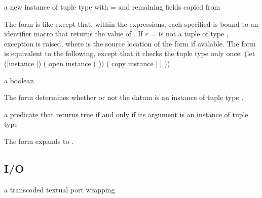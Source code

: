 \begin{syntax}
\end{syntax}
\returns{} a new instance of tuple type  with  =
 \etc{} and remaining fields copied from 

The  form is like  except that, within the  expressions,
each specified  is bound to an identifier macro that returns the value of .
If $r$ =  is not a tuple of type , exception
 is raised, where
 is the source location of the  form if avalable.
The  form is equivalent to the following, except that it
checks the tuple type only once:
\antipar\codebegin
(let ([instance ])
  ( open instance ( \etc{}))
  ( copy instance [ ] \etc{}))
\codeend\antipar

\begin{syntax}
\end{syntax}
\returns{} a boolean

The  form determines whether or not the datum  is
an instance of tuple type .

\begin{syntax}
\end{syntax}
\expandsto{} a predicate that returns true if and only if its argument
is an instance of tuple type 

The  form expands to .

\subsection {I/O}

\begin{procedure}
\end{procedure}
\returns{} a transcoded textual port wrapping 


